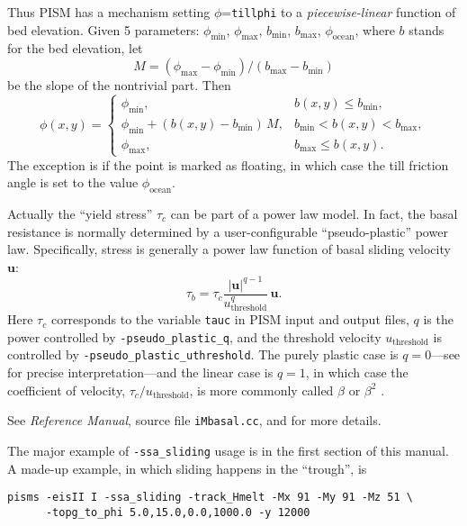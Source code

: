 Thus PISM has a mechanism setting $\phi$=\texttt{tillphi} to a \emph{piecewise-linear} function of bed elevation.  Given 5 parameters: $\phi_{\mathrm{min}}$, $\phi_{\mathrm{max}}$, $b_{\mathrm{min}}$, $b_{\mathrm{max}}$, $\phi_{\mathrm{ocean}}$, where $b$ stands for the bed elevation, let 
\begin{equation}
  M = (\phi_{\text{max}} - \phi_{\text{min}}) / (b_{\text{max}} - b_{\text{min}})\label{eq:1}
\end{equation}
be the slope of the nontrivial part.  Then
\begin{equation}
  \phi(x,y) = \begin{cases}
    \phi_{\text{min}}, & b(x,y) \le b_{\text{min}}, \\
    \phi_{\text{min}} + (b(x,y) - b_{\text{min}}) \,M,
    &  b_{\text{min}} < b(x,y) < b_{\text{max}}, \\
    \phi_{\text{max}}, & b_{\text{max}} \le b(x,y). \end{cases}\label{eq:2}
\end{equation}
The exception is if the point is marked as floating, in which case the till friction angle
is set to the value $\phi_{\mathrm{ocean}}$.

Actually the ``yield stress'' $\tau_c$ can be part of a power law model.  In fact, the basal resistance is normally determined by a user-configurable ``pseudo-plastic'' power law.  Specifically, stress is generally a power law function of basal sliding velocity $\mathbf{u}$:
   $$\tau_b = \tau_c \frac{|\mathbf{u}|^{q-1}}{u_{\text{threshold}}^q}\, \mathbf{u}.$$
Here $\tau_c$ corresponds to the variable \texttt{tauc} in PISM input and output files, $q$ is the power controlled by \texttt{-pseudo_plastic_q}, and the threshold velocity $u_{\text{threshold}}$ is controlled by \texttt{-pseudo_plastic_uthreshold}.  The purely plastic case is $q=0$---see \cite{SchoofStream} for precise interpretation---and the linear case is $q=1$, in which case the coefficient of velocity, $\tau_c/u_{\text{threshold}}$, is more commonly called $\beta$ or $\beta^2$ \cite{MacAyeal}.

See \emph{Reference Manual}, source file \texttt{iMbasal.cc}, and \cite{BBssasliding,BKAJS} for more details.

The major example of \texttt{-ssa_sliding} usage is in the first section of this manual.  A made-up example, in which sliding happens in the ``trough'', is
\begin{verbatim}
pisms -eisII I -ssa_sliding -track_Hmelt -Mx 91 -My 91 -Mz 51 \
      -topg_to_phi 5.0,15.0,0.0,1000.0 -y 12000
\end{verbatim}

